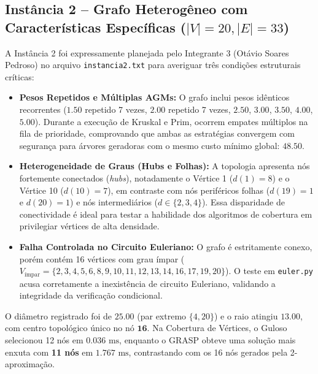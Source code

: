 \documentclass[12pt,a4paper]{article}
\begin{document}
\subsection{Instância 2 -- Grafo Heterogêneo com Características Específicas ($|V|=20, |E|=33$)}
A Instância 2 foi expressamente planejada pelo Integrante 3 (Otávio Soares Pedroso) no arquivo \texttt{instancia2.txt} para averiguar três condições estruturais críticas:
\begin{itemize}
    \item \textbf{Pesos Repetidos e Múltiplas AGMs:} O grafo inclui pesos idênticos recorrentes ($1.50$ repetido 7 vezes, $2.00$ repetido 7 vezes, $2.50$, $3.00$, $3.50$, $4.00$, $5.00$). Durante a execução de Kruskal e Prim, ocorrem empates múltiplos na fila de prioridade, comprovando que ambas as estratégias convergem com segurança para árvores geradoras com o mesmo custo mínimo global: $\mathbf{48.50}$.
    \item \textbf{Heterogeneidade de Graus (Hubs e Folhas):} A topologia apresenta nós fortemente conectados (\textit{hubs}), notadamente o Vértice 1 ($d(1) = 8$) e o Vértice 10 ($d(10) = 7$), em contraste com nós periféricos folhas ($d(19) = 1$ e $d(20) = 1$) e nós intermediários ($d \in \{2, 3, 4\}$). Essa disparidade de conectividade é ideal para testar a habilidade dos algoritmos de cobertura em privilegiar vértices de alta densidade.
    \item \textbf{Falha Controlada no Circuito Euleriano:} O grafo é estritamente conexo, porém contém 16 vértices com grau ímpar ($V_{\text{ímpar}} = \{2, 3, 4, 5, 6, 8, 9, 10, 11, 12, 13, 14, 16, 17, 19, 20\}$). O teste em \texttt{euler.py} acusa corretamente a inexistência de circuito Euleriano, validando a integridade da verificação condicional.
\end{itemize}

O diâmetro registrado foi de $\mathbf{25.00}$ (par extremo $\{4, 20\}$) e o raio atingiu $\mathbf{13.00}$, com centro topológico único no nó $\mathbf{16}$. Na Cobertura de Vértices, o Guloso selecionou 12 nós em $0.036\text{ ms}$, enquanto o GRASP obteve uma solução mais enxuta com \textbf{11 nós} em $1.767\text{ ms}$, contrastando com os 16 nós gerados pela 2-aproximação.
\end{document}
